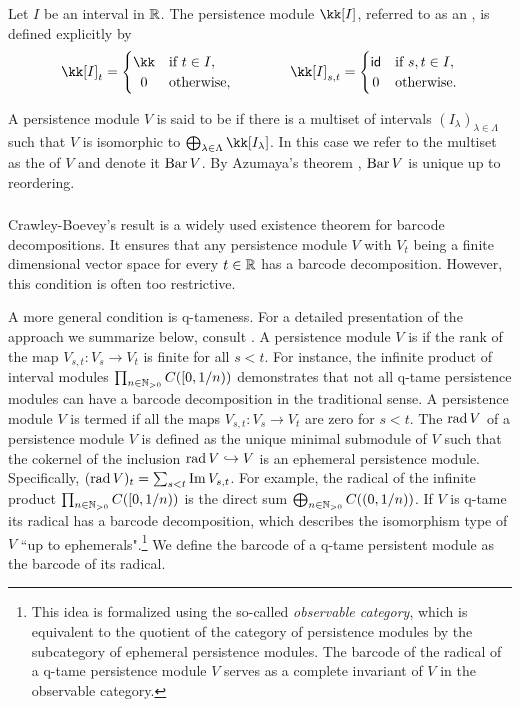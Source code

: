 Let $I$ be an interval in $\mathbb{R}$.
The persistence module $\kk[I]$, referred to as an , is defined explicitly by
\[
\kk[I]_t =
\begin{cases}
	\kk & \text{if } t \in I, \\
	\hfil 0 & \text{otherwise},
\end{cases}
\qquad \qquad
\kk[I]_{s, t} =
\begin{cases}
	\id & \text{if } s, t \in I, \\
	\hfil 0 & \text{otherwise}.
\end{cases}
\]

A persistence module $V$ is said to be  if there is a multiset of intervals $(I_\lambda)_{\lambda \in \Lambda}$ such that $V$ is isomorphic to $\bigoplus_{\lambda \in \Lambda} \kk[I_\lambda]$.
In this case we refer to the multiset as the  of $V$ and denote it $\operatorname{Bar} V$.
By Azumaya’s theorem \cite{azumaya1950theorem}, $\operatorname{Bar} V$ is unique up to reordering.

\subsubsection{}

Crawley-Boevey's result \cite{Crawley-Boevey.2015} is a widely used existence theorem for barcode decompositions.
It ensures that any persistence module \(V\) with \(V_t\) being a finite dimensional vector space for every \(t \in \mathbb{R}\) has a barcode decomposition.
However, this condition is often too restrictive.

A more general condition is q-tameness.
For a detailed presentation of the approach we summarize below, consult \cite{Chazal.2016a, Chazal.2016b}.
A persistence module \(V\) is  if the rank of the map \(V_{s,t} \colon V_s \to V_t\) is finite for all \(s < t\).
For instance, the infinite product of interval modules \(\prod_{n \in \mathbb{N}_{> 0}} C([0,1/n))\) demonstrates that not all q-tame persistence modules can have a barcode decomposition in the traditional sense.
A persistence module \(V\) is termed  if all the maps \(V_{s,t} \colon V_s \to V_t\) are zero for \(s < t\).
The  \(\operatorname{rad} V\) of a persistence module \(V\) is defined as the unique minimal submodule of \(V\) such that the cokernel of the inclusion \(\operatorname{rad} V \hookrightarrow V\) is an ephemeral persistence module.
Specifically, \((\operatorname{rad} V)_t = \sum_{s<t} \operatorname{Im} V_{s,t}\).
For example, the radical of the infinite product \(\prod_{n \in \mathbb{N}_{> 0}} C([0, 1/n))\) is the direct sum \(\bigoplus_{n \in \mathbb{N}_{> 0}} C((0,1/n))\).
If \(V\) is q-tame its radical has a barcode decomposition, which describes the isomorphism type of \(V\) ``up to ephemerals".\footnote{
This idea is formalized using the so-called \textit{observable category}, which is equivalent to the quotient of the category of persistence modules by the subcategory of ephemeral persistence modules.
The barcode of the radical of a q-tame persistence module \(V\) serves as a complete invariant of \(V\) in the observable category.}
We define the barcode of a q-tame persistent module as the barcode of its radical.

